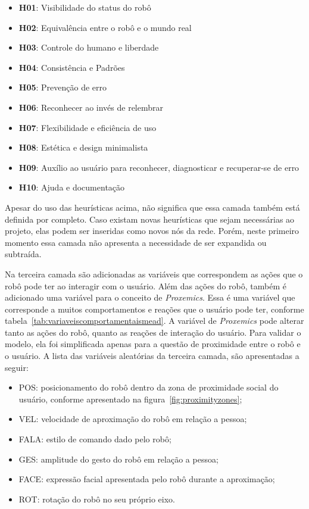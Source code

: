 \begin{itemize}
	\item \textbf{H01}: Visibilidade do status do robô
	\item \textbf{H02}: Equivalência entre o robô e o mundo real
	\item \textbf{H03}: Controle do humano e liberdade
	\item \textbf{H04}: Consistência e Padrões
	\item \textbf{H05}: Prevenção de erro
	\item \textbf{H06}: Reconhecer ao invés de relembrar
	\item \textbf{H07}: Flexibilidade e eficiência de uso
	\item \textbf{H08}: Estética e design minimalista
	\item \textbf{H09}: Auxílio ao usuário para reconhecer, diagnosticar e recuperar-se de erro
	\item \textbf{H10}: Ajuda e documentação
\end{itemize}

Apesar do uso das heurísticas acima, não significa que essa camada também está definida por completo. Caso existam novas heurísticas que sejam necessárias ao projeto, elas podem ser inseridas como novos nós da rede. Porém, neste primeiro momento essa camada não apresenta a necessidade de ser expandida ou subtraída.

Na terceira camada são adicionadas as variáveis que correspondem as ações que o robô pode ter ao interagir com o usuário. Além das ações do robô, também é adicionado uma variável para o conceito de \emph{Proxemics}. Essa é uma variável que corresponde a muitos comportamentos e reações que o usuário pode ter, conforme tabela~\ref{tab:variaveiscomportamentaismead}. A variável de \emph{Proxemics} pode alterar tanto as ações do robô, quanto as reações de interação do usuário. Para validar o modelo, ela foi simplificada apenas para a questão de proximidade entre o robô e o usuário. A lista das variáveis aleatórias da terceira camada, são apresentadas a seguir:

\begin{itemize}
	\item POS: posicionamento do robô dentro da zona de proximidade social do usuário, conforme apresentado na figura~\ref{fig:proximityzones};
	\item VEL: velocidade de aproximação do robô em relação a pessoa;
	\item FALA: estilo de comando dado pelo robô;
	\item GES: amplitude do gesto do robô em relação a pessoa;
	\item FACE: expressão facial apresentada pelo robô durante a aproximação;
	\item ROT: rotação do robô no seu próprio eixo.
\end{itemize}

